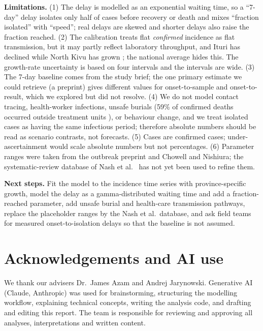 \documentclass[10pt,a4paper]{article}
\begin{document}
\textbf{Limitations.} (1) The delay is modelled as an exponential waiting time, so a ``7-day'' delay isolates only half of cases before recovery or death and mixes ``fraction isolated'' with ``speed''; real delays are skewed and shorter delays also raise the fraction reached. (2) The calibration treats flat \emph{confirmed} incidence as flat transmission, but it may partly reflect laboratory throughput, and Ituri has declined while North Kivu has grown \cite{ukhsa}; the national average hides this. The growth-rate uncertainty is based on four intervals and the intervals are wide. (3) The 7-day baseline comes from the study brief; the one primary estimate we could retrieve (a preprint) gives different values for onset-to-sample and onset-to-result, which we explored but did not resolve. (4) We do not model contact tracing, health-worker infections, unsafe burials (59\% of confirmed deaths occurred outside treatment units \cite{kabasele}), or behaviour change, and we treat isolated cases as having the same infectious period; therefore absolute numbers should be read as scenario contrasts, not forecasts. (5) Cases are confirmed cases; under-ascertainment would scale absolute numbers but not percentages. (6) Parameter ranges were taken from the outbreak preprint and Chowell and Nishiura; the systematic-review database of Nash et al.\ \cite{nash} has not yet been used to refine them.

\textbf{Next steps.} Fit the model to the incidence time series with province-specific growth, model the delay as a gamma-distributed waiting time and add a fraction-reached parameter, add unsafe burial and health-care transmission pathways, replace the placeholder ranges by the Nash et al.\ database, and ask field teams for measured onset-to-isolation delays so that the baseline is not assumed.

\section*{Acknowledgements and AI use}
We thank our advisers Dr.\ James Azam and Andrej Jarynowski. Generative AI (Claude, Anthropic) was used for brainstorming, structuring the modelling workflow, explaining technical concepts, writing the analysis code, and drafting and editing this report. The team is responsible for reviewing and approving all analyses, interpretations and written content.
\end{document}
